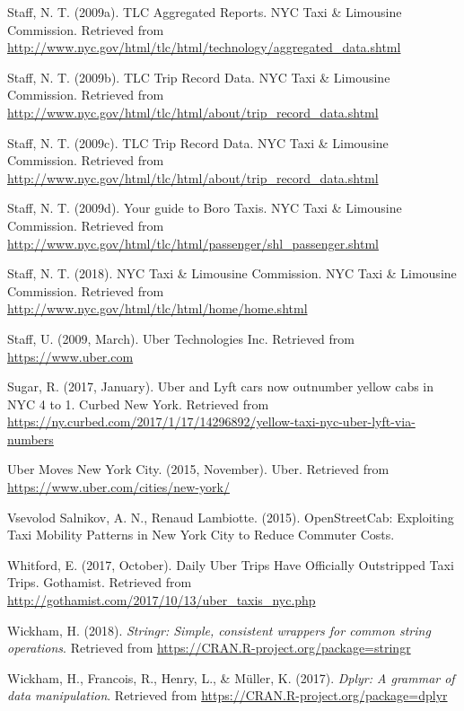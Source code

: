 \documentclass[12pt,twoside]{reedthesis}
\theoremstyle{definition}
\theoremstyle{definition}
\theoremstyle{definition}
\theoremstyle{remark}
\begin{document}
\hypertarget{ref-datayellowmonth}{}
Staff, N. T. (2009a). TLC Aggregated Reports. NYC Taxi \& Limousine
Commission. Retrieved from
\url{http://www.nyc.gov/html/tlc/html/technology/aggregated_data.shtml}

\hypertarget{ref-datayellow}{}
Staff, N. T. (2009b). TLC Trip Record Data. NYC Taxi \& Limousine
Commission. Retrieved from
\url{http://www.nyc.gov/html/tlc/html/about/trip_record_data.shtml}

\hypertarget{ref-datauber}{}
Staff, N. T. (2009c). TLC Trip Record Data. NYC Taxi \& Limousine
Commission. Retrieved from
\url{http://www.nyc.gov/html/tlc/html/about/trip_record_data.shtml}

\hypertarget{ref-greentaxi}{}
Staff, N. T. (2009d). Your guide to Boro Taxis. NYC Taxi \& Limousine
Commission. Retrieved from
\url{http://www.nyc.gov/html/tlc/html/passenger/shl_passenger.shtml}

\hypertarget{ref-nyctlc}{}
Staff, N. T. (2018). NYC Taxi \& Limousine Commission. NYC Taxi \&
Limousine Commission. Retrieved from
\url{http://www.nyc.gov/html/tlc/html/home/home.shtml}

\hypertarget{ref-uberweb}{}
Staff, U. (2009, March). Uber Technologies Inc. Retrieved from
\url{https://www.uber.com}

\hypertarget{ref-sugar2017}{}
Sugar, R. (2017, January). Uber and Lyft cars now outnumber yellow cabs
in NYC 4 to 1. Curbed New York. Retrieved from
\url{https://ny.curbed.com/2017/1/17/14296892/yellow-taxi-nyc-uber-lyft-via-numbers}

\hypertarget{ref-ubernyc}{}
Uber Moves New York City. (2015, November). Uber. Retrieved from
\url{https://www.uber.com/cities/new-york/}

\hypertarget{ref-guerrini2015}{}
Vsevolod Salnikov, A. N., Renaud Lambiotte. (2015). OpenStreetCab:
Exploiting Taxi Mobility Patterns in New York City to Reduce Commuter
Costs.

\hypertarget{ref-emma2017}{}
Whitford, E. (2017, October). Daily Uber Trips Have Officially
Outstripped Taxi Trips. Gothamist. Retrieved from
\url{http://gothamist.com/2017/10/13/uber_taxis_nyc.php}

\hypertarget{ref-pkgstringr}{}
Wickham, H. (2018). \emph{Stringr: Simple, consistent wrappers for
common string operations}. Retrieved from
\url{https://CRAN.R-project.org/package=stringr}

\hypertarget{ref-pkgdplyr}{}
Wickham, H., Francois, R., Henry, L., \& Müller, K. (2017). \emph{Dplyr:
A grammar of data manipulation}. Retrieved from
\url{https://CRAN.R-project.org/package=dplyr}
\end{document}
